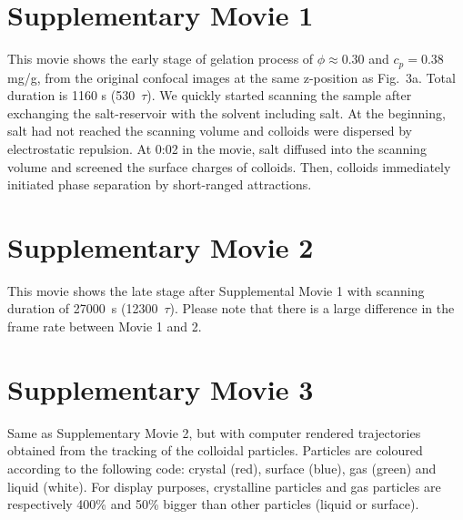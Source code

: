 


\clearpage

\section*{Supplementary Movie 1}
This movie shows the early stage of gelation process of $\phi\approx 0.30$ and $c_p=0.38$ mg/g, from the original confocal images at the same z-position as Fig.~3a. Total duration is 1160 s (530~$\tau$). We quickly started scanning the sample after exchanging the salt-reservoir with the solvent including salt. At the beginning, salt had not reached the scanning volume and colloids were dispersed by electrostatic repulsion. At 0:02 in the movie, salt diffused into the scanning volume and screened the surface charges of colloids. Then, colloids immediately initiated phase separation by short-ranged attractions.

\section*{Supplementary Movie 2}
This movie shows the late stage after Supplemental Movie 1 with scanning duration of 27000~s (12300~$\tau$). Please note that there is a large difference in the frame rate between Movie 1 and 2. 

\section*{Supplementary Movie 3}
Same as Supplementary Movie 2, but with computer rendered trajectories obtained from the tracking of the colloidal particles. Particles are coloured according to the following code: crystal (red), surface (blue), gas (green) and liquid (white). For display purposes, crystalline particles and gas particles are respectively 400\% and 50\% bigger than other particles (liquid or surface).




